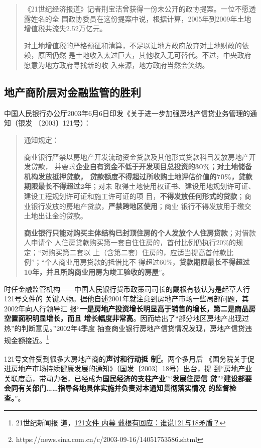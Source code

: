 \begin{quotation}
《21世纪经济报道》记者荆宝洁曾获得一份未公开的政协提案。一位不愿透露姓名的全
国政协委员在这份提案中说，根据计算，2005年到2009年土地增值税共流失2.52万亿元。

对土地增值税的严格预征和清算，不足以让地方政府放弃对土地财政的依赖，原因仍然
是土地收入太过巨大，其他收入无可替代。不过，中央政府愿意为地方政府寻找新的收
入来源，地方政府当然会笑纳。\cite{2011feiteng}
\end{quotation}

\subsection{地产商阶层对金融监管的胜利}

中国人民银行办公厅2003年6月6日印发《关于进一步加强房地产信贷业务管理的通知（银发
〔2003〕121号）：
\begin{quotation}
  通知规定：

  商业银行严禁以房地产开发流动资金贷款及其他形式贷款科目发放房地产开发贷款，
  并要求\textbf{企业自有资金不低于开发项目总投资的30\%；对土地储备机构发放抵押贷款，
    贷款额度不得超过所收购土地评估价值的70\%，贷款期限最长不得超过2年}；对未
  取得土地使用权证书、建设用地规划许可证、建设工程规划许可证和施工许可证的项
  目，\textbf{不得发放任何形式的贷款}；商业银行发放的房地产贷款，\textbf{严禁跨地区使用}；商业
  银行不得发放用于缴交土地出让金的贷款。

  \textbf{商业银行只能对购买主体结构已封顶住房的个人发放个人住房贷款}；对借款人申请个
  人住房贷款购买第一套自住住房的，首付比例仍执行20\%的规定；“对购买第二套以
  上（含第二套）住房的，应适当提高首付款比例”；“个人商业用房贷款的抵借比不
  得超过60\%，\textbf{贷款期限最长不得超过10年，并且所购商业用房为竣工验收的房屋}”。
\end{quotation}

时任金融监管机构——中国人民银行货币政策司司长的戴根有被认为是起草人行121号文件的
关键人物。据他自述2001年就注意到房地产市场一些局部问题，其2002年向人行领导汇
报“\textbf{一是房地产投资增长明显高于销售的增长，第二是商品房空置面积明显增长，而且
增长幅度非常高}。因而给出了“部分地区房地产出现过热”的判断意见。”2002年4季度
抽查商业银行房地产信贷情况发现，房地产信贷违规金额接近。\footnote{21世纪新闻报
  道，\href{https://finance.sina.com.cn/x/20031101/1105501003.shtml}{121文件
    内幕 戴根有回应：谁说121与18矛盾？}}

121号文件受到很多大房地产商的\textbf{声讨和行动抵
  制}\footnote{https://news.sina.com.cn/c/2003-09-16/14051753586.shtml}。两个多月后
《国务院关于促进房地产市场持续健康发展的通知》（国发〔2003〕18号）出台，提
到“房地产业关联度高，带动力强，已经成为\textbf{国民经济的支柱产业}”“\textbf{发展住房信
  贷}”“\textbf{建设部要会同有关部门……指导各地具体实施并负责对本通知贯彻落实情况
  的监督检查。}”。

